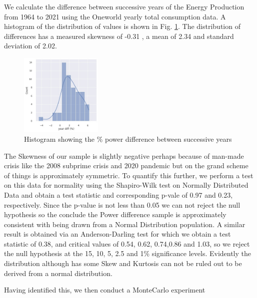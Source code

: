 \documentclass[final,5p,times,twocolumn,authoryear]{elsarticle}
\begin{document}
We calculate the difference between successive years of the Energy Production from 1964 to 2021 using the Oneworld yearly total consumption data. A histogram of the distribution of values is shown in Fig. \ref{fig:his_power}. The distribution of differences has a measured skewness of -0.31 \cite{zw00}, a mean of 2.34 and standard deviation of 2.02. 

\begin{figure}
    \centering
    \includegraphics[width=0.35\textwidth]{figs/fig_pc_powerdiff.jpg}
    \vspace*{-0.3cm}
    \caption{Histogram showing the \% power difference between successive years}
    \label{fig:his_power}
\end{figure}

The Skewness of our sample is slightly negative perhaps because of man-made crisis like the 2008 subprime crisis and 2020 pandemic but on the grand scheme of things is approximately symmetric. To quantify this further, we perform a test on this data for normality using the Shapiro-Wilk test on Normally Distributed Data and obtain a test statistic and corresponding p-vale of 0.97 and 0.23, respectively. Since the p-value is not less than 0.05 we can not reject the null hypothesis so the conclude the Power difference sample is approximately consistent with being drawn from a Normal Distribution population. A similar result is obtained via an Anderson-Darling test for which we obtain a test statistic of 0.38, and critical values of 0.54, 0.62, 0.74,0.86 and 1.03, so we reject the null hypothesis at the 15, 10, 5, 2.5 and 1\% significance levels. Evidently the distribution although has some Skew and Kurtosis can not be ruled out to be derived from a normal distribution.

Having identified this, we then conduct a MonteCarlo experiment 
\end{document}
